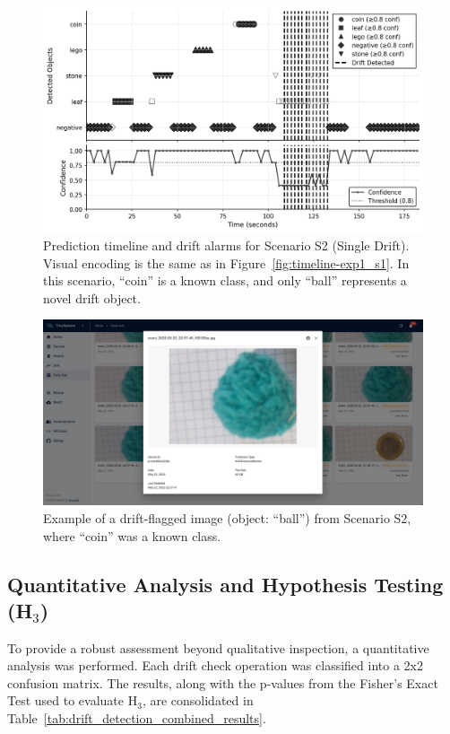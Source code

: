 \begin{figure}[htbp]
  \centering
  \includegraphics[width=.98\linewidth]{figs/evaluation//drift_ball_timeline.png}
  \caption[Drift Prediction Timeline for Scenario S2 (Single Drift)]{Prediction timeline and drift alarms for Scenario S2 (Single Drift). Visual encoding is the same as in Figure~\ref{fig:timeline-exp1_s1}. In this scenario, ``coin'' is a known class, and only ``ball'' represents a novel drift object.}
  \label{fig:timeline-exp2_s2}
\end{figure}

\begin{figure}[htbp]
  \centering
  \includegraphics[width=0.59\linewidth]{figs/evaluation/drift_image_exp2_ball.png}
  \caption[Drift Image of Scenario 2 (Single Drift)]{Example of a drift-flagged image (object: ``ball'') from Scenario S2, where ``coin'' was a known class.}
  \label{fig:drift-image-ball-s2}
\end{figure}

\subsection{Quantitative Analysis and Hypothesis Testing (H$_3$)}
\label{ssec:phase2_quantitative_drift_metrics}

To provide a robust assessment beyond qualitative inspection, a quantitative analysis was performed. Each drift check operation was classified into a 2x2 confusion matrix. The results, along with the p-values from the Fisher's Exact Test used to evaluate H$_3$, are consolidated in Table~\ref{tab:drift_detection_combined_results}.


